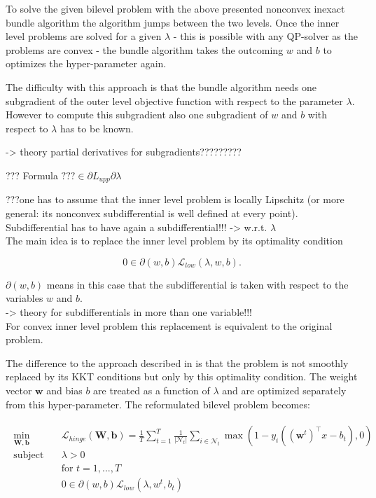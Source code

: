 
To solve the given bilevel problem with the above presented nonconvex inexact bundle algorithm the algorithm jumps between the two levels. Once the inner level problems are solved for a given \(\lambda\) - this is possible with any QP-solver as the problems are convex - the bundle algorithm takes the outcoming \(w\) and \(b\) to optimizes the hyper-parameter again.

The difficulty with this approach is that the bundle algorithm needs one subgradient of the outer level objective function with respect to the parameter \(\lambda\). However to compute this subgradient also one subgradient of \(w\) and \(b\) with respect to \(\lambda\) has to be known.

-> theory partial derivatives for subgradients?????????

??? Formula \(??? \in \partial L_{upp}{\partial \lambda}\)

???one has to assume that the inner level problem is locally Lipschitz (or more general: its nonconvex subdifferential is well defined at every point). \\
Subdifferential has to have again a subdifferential!!! -> w.r.t. \(\lambda\) \\
The main idea is to replace the inner level problem by its optimality condition

\begin{equation}
	0 \in \partial(w,b)\mathcal{L}_{low}(\lambda,w,b).
\label{opt_con}
\end{equation}

\(\partial(w,b)\) means in this case that the subdifferential is taken with respect to the variables \(w\) and \(b\). \\
-> theory for subdifferentials in more than one variable!!! \\

For convex inner level problem this replacement is equivalent to the original problem.

The difference to the approach described in \cite{Kunapuli2008} is that the problem is not smoothly replaced by its KKT conditions but only by this optimality condition. The weight vector \(\bm{w}\) and bias \(b\) are treated as a function of \(\lambda\) and are optimized separately from this hyper-parameter.
The reformulated bilevel problem becomes:

\begin{align}
	\begin{split}
	\min_{\bm{W},\bm{b}} \quad &  \mathcal{L}_{hinge}(\bm{W},\bm{b}) = \frac{1}{T}\sum_{t=1}^T\frac{1}{|\mathcal{N}_t|}\sum_{i \in \mathcal{N}_t}{\max\left(1-y_i((\bm{w}^t)^{\top}x-b_t),0\right)}\\
	\text{subject to} \quad & \lambda > 0 \\
	& \text{for } t = 1,...,T \\
	& 0 \in \partial(w,b)\mathcal{L}_{low}(\lambda,w^t,b_t) \\
\end{split}
\label{SVM_opt_cond}
\end{align}

